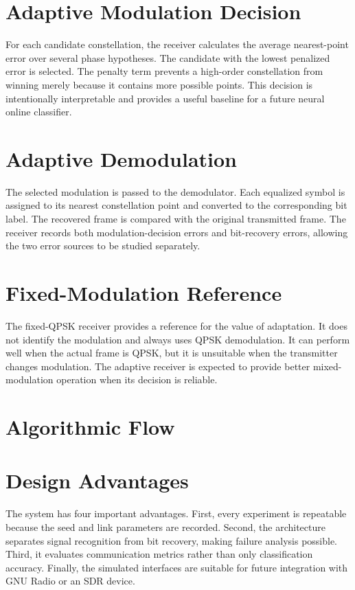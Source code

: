 \section{Adaptive Modulation Decision}
For each candidate constellation, the receiver calculates the average
nearest-point error over several phase hypotheses. The candidate with the
lowest penalized error is selected. The penalty term prevents a high-order
constellation from winning merely because it contains more possible points.
This decision is intentionally interpretable and provides a useful baseline
for a future neural online classifier.

\section{Adaptive Demodulation}
The selected modulation is passed to the demodulator. Each equalized symbol
is assigned to its nearest constellation point and converted to the
corresponding bit label. The recovered frame is compared with the original
transmitted frame. The receiver records both modulation-decision errors and
bit-recovery errors, allowing the two error sources to be studied separately.

\section{Fixed-Modulation Reference}
The fixed-QPSK receiver provides a reference for the value of adaptation. It
does not identify the modulation and always uses QPSK demodulation. It can
perform well when the actual frame is QPSK, but it is unsuitable when the
transmitter changes modulation. The adaptive receiver is expected to provide
better mixed-modulation operation when its decision is reliable.

\section{Algorithmic Flow}

\section{Design Advantages}
The system has four important advantages. First, every experiment is
repeatable because the seed and link parameters are recorded. Second, the
architecture separates signal recognition from bit recovery, making failure
analysis possible. Third, it evaluates communication metrics rather than only
classification accuracy. Finally, the simulated interfaces are suitable for
future integration with GNU Radio or an SDR device.
